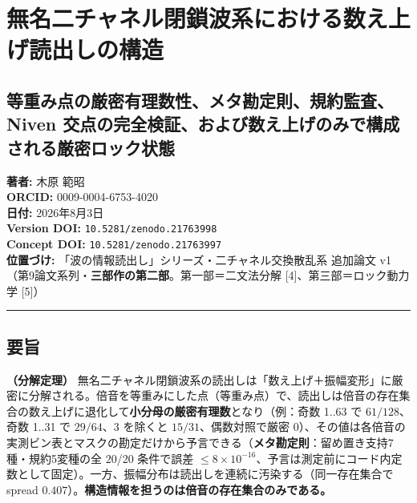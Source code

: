 \documentclass[
  a4paper,
]{ltjsarticle}
\author{}
\date{}
\begin{document}
\section{無名二チャネル閉鎖波系における数え上げ読出しの構造}\label{ux7121ux540dux4e8cux30c1ux30e3ux30cdux30ebux9589ux9396ux6ce2ux7cfbux306bux304aux3051ux308bux6570ux3048ux4e0aux3052ux8aadux51faux3057ux306eux69cbux9020}

\subsection{等重み点の厳密有理数性、メタ勘定則、規約監査、Niven
交点の完全検証、および数え上げのみで構成される厳密ロック状態}\label{ux7b49ux91cdux307fux70b9ux306eux53b3ux5bc6ux6709ux7406ux6570ux6027ux30e1ux30bfux52d8ux5b9aux5247ux898fux7d04ux76e3ux67fbniven-ux4ea4ux70b9ux306eux5b8cux5168ux691cux8a3cux304aux3088ux3073ux6570ux3048ux4e0aux3052ux306eux307fux3067ux69cbux6210ux3055ux308cux308bux53b3ux5bc6ux30edux30c3ux30afux72b6ux614b}

\textbf{著者:} 木原 範昭\\
\textbf{ORCID:} 0009-0004-6753-4020\\
\textbf{日付:} 2026年8月3日\\
\textbf{Version DOI:} \texttt{10.5281/zenodo.21763998}\\
\textbf{Concept DOI:} \texttt{10.5281/zenodo.21763997}\\
\textbf{位置づけ:} 「波の情報読出し」シリーズ・二チャネル交換散乱系
追加論文 v1（第9論文系列・\textbf{三部作の第二部}。第一部＝二文法分解
{[}4{]}、第三部＝ロック動力学 {[}5{]}）

\begin{center}\rule{0.5\linewidth}{0.5pt}\end{center}

\subsection{要旨}\label{ux8981ux65e8}

\textbf{（分解定理）}
無名二チャネル閉鎖波系の読出しは「数え上げ＋振幅変形」に厳密に分解される。倍音を等重みにした点（等重み点）で、読出しは倍音の存在集合の数え上げに退化して\textbf{小分母の厳密有理数}となり（例：奇数
1..63 で \(61/128\)、奇数 1..31 で \(29/64\)、3 を除くと
\(15/31\)、偶数対照で厳密
\(0\)）、その値は各倍音の実測ビン表とマスクの勘定だけから予言できる（\textbf{メタ勘定則}：留め置き支持7種・規約5変種の全
20/20 条件で誤差
\(\le8\times10^{-16}\)、予言は測定前にコード内定数として固定）。一方、振幅分布は読出しを連続に汚染する（同一存在集合で
spread
\(0.407\)）。\textbf{構造情報を担うのは倍音の存在集合のみである。}
\end{document}
